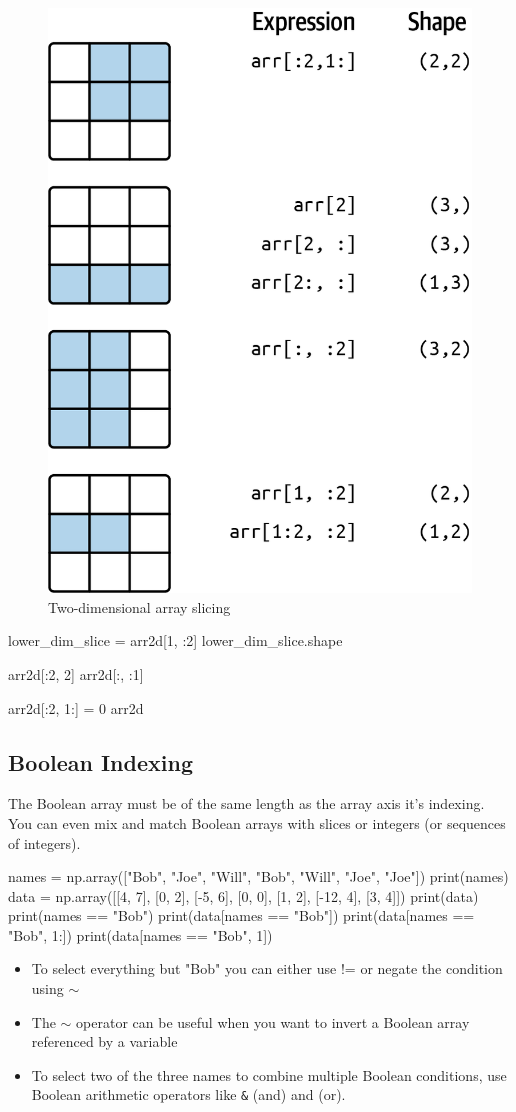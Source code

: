 \begin{figure}
    \centering
    \includegraphics[width=.5\textwidth]{img/codes/Two-dimensional array slicing.png}
    \caption{Two-dimensional array slicing}
    \label{Two-dimensional array slicing}
\end{figure}

\begin{pyc}
lower_dim_slice = arr2d[1, :2]
lower_dim_slice.shape

arr2d[:2, 2]
arr2d[:, :1]

arr2d[:2, 1:] = 0
arr2d
\end{pyc}
\subsection{Boolean Indexing}
The Boolean array must be of the same length as the array axis it's indexing. You can even mix and match Boolean arrays with slices or integers (or sequences of integers).

\begin{pyc}
names = np.array(["Bob", "Joe", "Will", "Bob", "Will", "Joe", "Joe"])
print(names)
data = np.array([[4, 7], [0, 2], [-5, 6], [0, 0], [1, 2], [-12, 4], [3, 4]])
print(data)
print(names == "Bob")
print(data[names == "Bob"])
print(data[names == "Bob", 1:])
print(data[names == "Bob", 1])
\end{pyc}

\begin{itemize}
    \item To select everything but "Bob" you can either use != or negate the condition using $\sim$
    \item The $\sim$ operator can be useful when you want to invert a Boolean array referenced by a variable
    \item To select two of the three names to combine multiple Boolean conditions, use Boolean arithmetic operators like \verb|&| (and) and \textbar (or).
\end{itemize}

